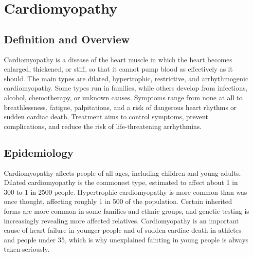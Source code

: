 \chapter{Cardiomyopathy}

\section*{Definition and Overview}
Cardiomyopathy is a disease of the heart muscle in which the heart becomes enlarged, thickened, or stiff, so that it cannot pump blood as effectively as it should. The main types are dilated, hypertrophic, restrictive, and arrhythmogenic cardiomyopathy. Some types run in families, while others develop from infections, alcohol, chemotherapy, or unknown causes. Symptoms range from none at all to breathlessness, fatigue, palpitations, and a risk of dangerous heart rhythms or sudden cardiac death. Treatment aims to control symptoms, prevent complications, and reduce the risk of life-threatening arrhythmias.

\section*{Epidemiology}
Cardiomyopathy affects people of all ages, including children and young adults. Dilated cardiomyopathy is the commonest type, estimated to affect about 1 in 300 to 1 in 2500 people. Hypertrophic cardiomyopathy is more common than was once thought, affecting roughly 1 in 500 of the population. Certain inherited forms are more common in some families and ethnic groups, and genetic testing is increasingly revealing more affected relatives. Cardiomyopathy is an important cause of heart failure in younger people and of sudden cardiac death in athletes and people under 35, which is why unexplained fainting in young people is always taken seriously.

